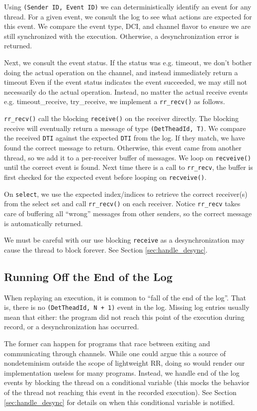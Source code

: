 \documentclass{article}
\begin{document}
Using \texttt{(Sender ID, Event ID)} we can deterministically identify an event for any thread.
For a given event, we consult the log to see what actions are expected for this event.
We compare the event type, DCI, and channel flavor to ensure we are still
synchronized with the execution. Otherwise, a desynchronization error is returned.

Next, we consult the event status. If the status was e.g. timeout, we don't bother
doing the actual operation on the channel, and instead immediately return a timeout
Even if the event status indicates the event succeeded, we may still not necessarily
do the actual operation. Instead, no matter the actual receive events e.g.
timeout\_receive, try\_receive, we implement a \texttt{rr\_recv()} as follows.

\texttt{rr\_recv()} call the blocking \texttt{receive()} on the receiver directly.
The blocking receive will eventually return a message of type \texttt{(DetTheadId, T)}. We
compare the received \texttt{DTI} against the expected \texttt{DTI} from the log.
If they match,
we have found the correct message to return. Otherwise, this event came from another
thread, so we add it to a per-receiver buffer of messages. We loop on \texttt{recveive()}
until the correct event is found. Next time there is a call to \texttt{rr\_recv},
the buffer is first checked for the expected event before looping on \texttt{recveive()}.

On \texttt{select}, we use the expected index/indices to retrieve the correct receiver(s)
from the select set and call \texttt{rr\_recv()} on each receiver. Notice \texttt{rr\_recv}
takes care of buffering all ``wrong'' messages from other senders, so the correct message
is automatically returned.

We must be careful with our use blocking \texttt{receive} as a desynchronization may
cause the thread to block forever. See Section \ref{sec:handle_desync}.

\subsection{Running Off the End of the Log}
When replaying an execution, it is common to ``fall of the end of the log''. That is,
there is no \texttt{(DetTheadId, N + 1)} event in the log. Missing log entries usually mean
that either: the program did not reach this point of the execution during record, or a desynchronization has occurred.

The former can happen for programs that race between exiting and communicating through
channels. While one could argue this a source of nondeteminism outside the scope of
lightweight RR, doing so would render our implementation useless for many programs.
Instead, we handle end of the log events by blocking the thread on a conditional
variable (this mocks the behavior of the thread not reaching this event in the recorded execution). See Section \ref{sec:handle_desync} for details on when this conditional variable
is notified.
\end{document}
